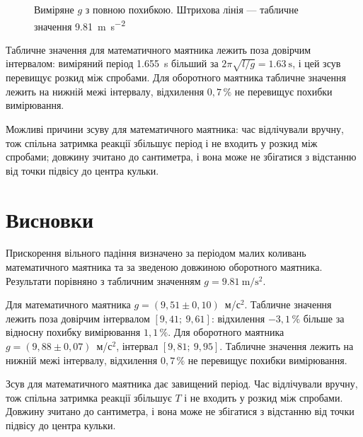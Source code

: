 \documentclass[ukrainian]{ucaphyslab}
\begin{document}
\begin{figure}[H]
  \centering
  \caption{Виміряне \(g\) з повною похибкою. Штрихова лінія — табличне значення \SI{9.81}{\meter\per\second\squared}}
  \label{fig:g}
\end{figure}

Табличне значення для математичного маятника лежить поза довірчим інтервалом: виміряний період \SI{1.655}{\second} більший за \(2\pi\sqrt{l/g} = \SI{1.63}{\second}\), і цей зсув перевищує розкид між спробами. Для оборотного маятника табличне значення лежить на нижній межі інтервалу, відхилення \(0{,}7\,\%\) не перевищує похибки вимірювання.

Можливі причини зсуву для математичного маятника: час відлічували вручну, тож спільна затримка реакції збільшує період і не входить у розкид між спробами; довжину зчитано до сантиметра, і вона може не збігатися з відстанню від точки підвісу до центра кульки.

\section{Висновки}
Прискорення вільного падіння визначено за періодом малих коливань математичного маятника та за зведеною довжиною оборотного маятника. Результати порівняно з табличним значенням \(g = \SI{9.81}{\meter\per\second\squared}\).

Для математичного маятника \(g = (9{,}51 \pm 0{,}10)\)~м/с\(^2\). Табличне значення лежить поза довірчим інтервалом \([9{,}41;\ 9{,}61]\): відхилення \(-3{,}1\,\%\) більше за відносну похибку вимірювання \(1{,}1\,\%\). Для оборотного маятника \(g = (9{,}88 \pm 0{,}07)\)~м/с\(^2\), інтервал \([9{,}81;\ 9{,}95]\). Табличне значення лежить на нижній межі інтервалу, відхилення \(0{,}7\,\%\) не перевищує похибки вимірювання.

Зсув для математичного маятника дає завищений період. Час відлічували вручну, тож спільна затримка реакції збільшує \(T\) і не входить у розкид між спробами. Довжину зчитано до сантиметра, і вона може не збігатися з відстанню від точки підвісу до центра кульки.

\end{document}

